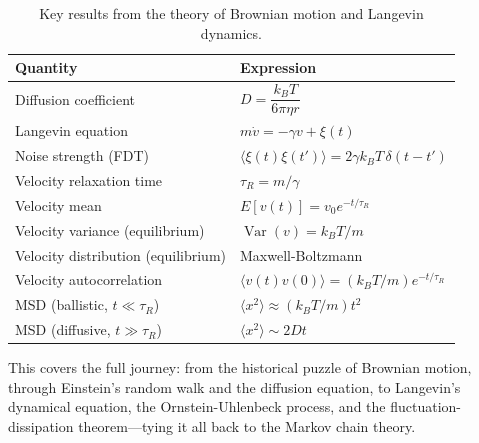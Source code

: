 \documentclass[11pt,a4paper]{article}
\begin{document}
	\begin{table}[h]
		\centering
		\begin{tabular}{@{}ll@{}}
			\toprule
			Quantity & Expression \\
			\midrule
			Diffusion coefficient & $D = \dfrac{k_B T}{6\pi \eta r}$ \\
			Langevin equation & $m\dot{v} = -\gamma v + \xi(t)$ \\
			Noise strength (FDT) & $\langle \xi(t)\xi(t') \rangle = 2\gamma k_B T \, \delta(t-t')$ \\
			Velocity relaxation time & $\tau_R = m/\gamma$ \\
			Velocity mean & $E[v(t)] = v_0 e^{-t/\tau_R}$ \\
			Velocity variance (equilibrium) & $\operatorname{Var}(v) = k_B T / m$ \\
			Velocity distribution (equilibrium) & Maxwell-Boltzmann \\
			Velocity autocorrelation & $\langle v(t)v(0) \rangle = (k_B T/m) e^{-t/\tau_R}$ \\
			MSD (ballistic, $t \ll \tau_R$) & $\langle x^2 \rangle \approx (k_B T/m) t^2$ \\
			MSD (diffusive, $t \gg \tau_R$) & $\langle x^2 \rangle \sim 2Dt$ \\
			\bottomrule
		\end{tabular}
		\caption{Key results from the theory of Brownian motion and Langevin dynamics.}
	\end{table}
	
	
	This covers the full journey: from the historical puzzle of Brownian motion, through Einstein's random walk and the diffusion equation, to Langevin's dynamical equation, the Ornstein-Uhlenbeck process, and the fluctuation-dissipation theorem---tying it all back to the Markov chain theory.
	
\end{document}
